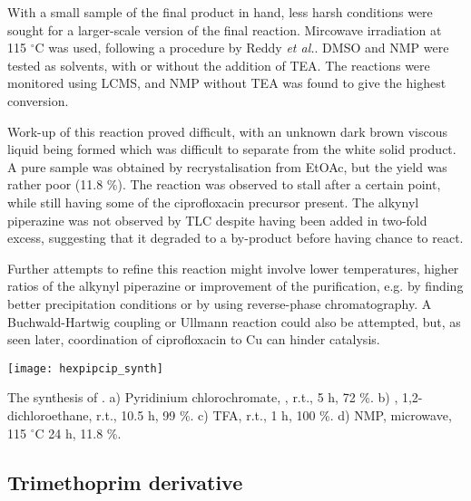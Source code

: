 With a small sample of the final product in hand, less harsh conditions were sought for a larger-scale version of the final reaction. Mircowave irradiation at 115 $^{\circ}$C was used, following a procedure by Reddy \textit{et al.}\cite{Reddy2001}. DMSO and NMP were tested as solvents, with or without the addition of TEA. The reactions were monitored using LCMS, and NMP without TEA was found to give the highest conversion. 

Work-up of this reaction proved difficult, with an unknown dark brown viscous liquid being formed which was difficult to separate from the white solid product. A pure sample was obtained by recrystalisation from EtOAc, but the yield was rather poor (11.8 \%). The reaction was observed to stall after a certain point, while still having some of the ciprofloxacin precursor  present. The alkynyl piperazine  was not observed by TLC despite having been added in two-fold excess, suggesting that it degraded to a by-product before having chance to react. 

Further attempts to refine this reaction might involve lower temperatures, higher ratios of the alkynyl piperazine  or improvement of the purification, e.g. by finding better precipitation conditions or by using reverse-phase chromatography. A Buchwald-Hartwig coupling or Ullmann reaction could also be attempted, but, as seen later, coordination of ciprofloxacin to Cu can hinder catalysis.

\begin{scheme}[H]
	\begin{center}
		\texttt{[image: hexpipcip\_synth]}
		\caption{The synthesis of . 
		a) Pyridinium chlorochromate, , r.t., 5 h, 72 \%.
		b) , 1,2-dichloroethane, r.t., 10.5 h, 99 \%.
		c) TFA, r.t., 1 h, 100 \%.
		d) NMP, microwave, 115 $^{\circ}$C 24 h, 11.8 \%.
		\label{sch:Y4Cip_synth}}
	\end{center}
\end{scheme}

\subsection{Trimethoprim derivative}

